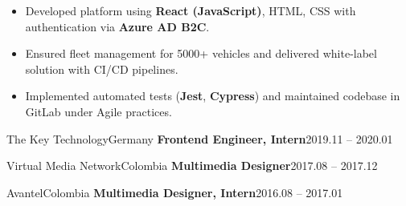 \documentclass[a4paper, 10pt]{article}
\begin{document}
{   
\begin{itemize}[label=$\circ$]
    \item Developed platform using \textbf{React (JavaScript)}, HTML, CSS with authentication via \textbf{Azure AD B2C}. 
    \item Ensured fleet management for 5000+ vehicles and delivered white-label solution with CI/CD pipelines.
    \item Implemented automated tests (\textbf{Jest}, \textbf{Cypress}) and maintained codebase in GitLab under Agile practices.
  \end{itemize}
\itemListEnd

\eduHeading
  {The Key Technology}{Germany}
  {\textbf{Frontend Engineer, Intern}}{2019.11 -- 2020.01}    
\vspace{10pt} 

\eduHeading
  {Virtual Media Network}{Colombia}
  {\textbf{Multimedia Designer}}{2017.08 -- 2017.12}
\vspace{10pt} 

\eduHeading
  {Avantel}{Colombia}
  {\textbf{Multimedia Designer, Intern}}{2016.08 -- 2017.01}
}
\end{document}
